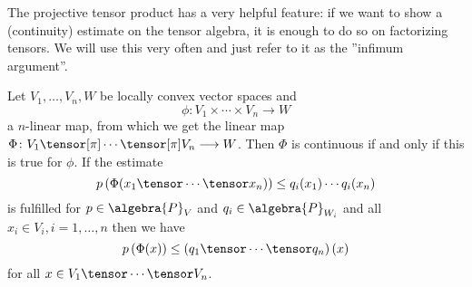 The projective tensor product has a very helpful feature: if we want to show a 
(continuity) estimate on the tensor algebra, it is enough to do so on 
factorizing tensors. We will use this very often and just refer to it as the 
''infimum argument''.
\begin{lemma}
	\label{Lemma:LCAna:InfimumArgument}
 	Let $V_1, \ldots, V_n, W$ be locally convex vector spaces and 
	\begin{equation*}
		\phi \colon
		V_1 \times \cdots \times V_n
		\longrightarrow
		W
	\end{equation*}
	a $n$-linear map, from which we get the linear map 
	$\Phi \colon V_1 \tensor[\pi] \cdots \tensor[\pi] V_n \longrightarrow W$.
	Then $\Phi$ is continuous if and only if this is true for $\phi$. 
	If the estimate
	\begin{equation}
		\label{LCAna:ContOnFactors}
		p \left(
			\Phi (x_1 \tensor \cdots \tensor x_n)
		\right)
		\leq
		q_i(x_1) \cdots q_i(x_n)
	\end{equation}
	is fulfilled for $p\in\algebra{P}_V$ and $q_i \in \algebra{P}_{W_i}$ 
	and all $x_i \in V_i, i=1, \ldots, n$ then we have
	\begin{equation}
		\label{LCAna:ContGeneral}
		p \left(
			\Phi (x)
		\right)
		\leq
		\left( q_1 \tensor \cdots \tensor q_n \right)(x)
	\end{equation}
	for all $x \in V_1 \tensor \cdots \tensor V_n$.
\end{lemma}
